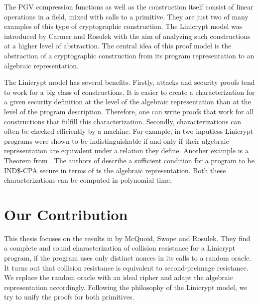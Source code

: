 The PGV compression functions as well as the \MD construction itself consist of linear operations in a field,
mixed with calls to a primitive.
They are just two of many examples of this type of cryptographic construction.
The Linicrypt model was introduced by Carmer and Rosulek \cite{C:CarRos16}
with the aim of analyzing such constructions at a higher level of abstraction.
The central idea of this proof model is the abstraction of a cryptographic construction from its program representation to an algebraic representation.

The Linicrypt model has several benefits.
Firstly, attacks and security proofs tend to work for a big class of constructions.
It is easier to create a characterization for a given security definition at the level of the algebraic representation than at the level of the program description. 
Therefore, one can write proofs that work for all constructions that fulfill this characterization.
Secondly, characterizations can often be checked efficiently by a machine.
For example, in \cite{C:CarRos16} two inputless Linicrypt programs were shown to be indistinguishable if and only if their algebraic representation are equivalent under a relation they define.
Another example is a Theorem from \cite{EPRINT:HolRosRoy22}.
The authors of describe a sufficient condition for a program to be IND\$-CPA secure in terms of ts the algebraic representation.
Both these characterizations can be computed in polynomial time.

\section{Our Contribution}

This thesis focuses on the results in \cite{TCC:McQSwoRos19} by McQuoid, Swope and Rosulek.
They find a complete and sound characterization of collision resistance for a Linicrypt program,
if the program uses only distinct nonces in its calls to a random oracle.
It turns out that collision resistance is equivalent to second-preimage resistance.
We replace the random oracle with an ideal cipher and adapt the algebraic representation accordingly.
Following the philosophy of the Linicrypt model,
we try to unify the proofs for both primitives.



